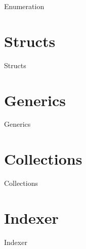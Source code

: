 \begin{frame}{Enumeration}
	
	
\end{frame}

\section{Structs}
\begin{frame}{Structs}

\end{frame}

\section{Generics}
\begin{frame}{Generics}

\end{frame}

\section{Collections}
\begin{frame}{Collections}
\end{frame}

\section{Indexer}
\begin{frame}{Indexer}

\end{frame}


